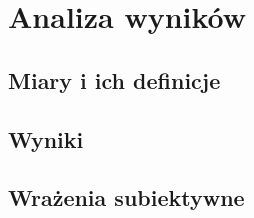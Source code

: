 \chapter{Analiza wyników}
{
    \section{Miary i ich definicje}
    {

    }

    \section{Wyniki}
    {

    }

    \section{Wrażenia subiektywne}
    {
        
    }
}